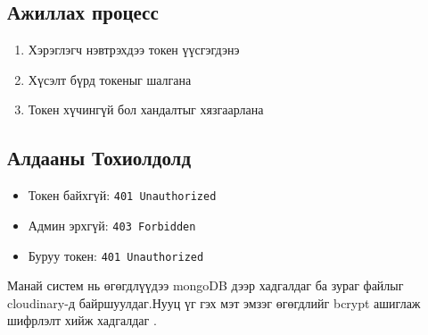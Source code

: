 \subsection{Ажиллах процесс}
\begin{enumerate}
\item Хэрэглэгч нэвтрэхдээ токен үүсгэгдэнэ
\item Хүсэлт бүрд токеныг шалгана
\item Токен хүчингүй бол хандалтыг хязгаарлана
\end{enumerate}

\subsection{Алдааны Тохиолдолд}

\begin{itemize}
\item Токен байхгүй: \texttt{401 Unauthorized}
\item Админ эрхгүй: \texttt{403 Forbidden}
\item Буруу токен: \texttt{401 Unauthorized}
\end{itemize}
Манай систем нь өгөгдлүүдээ mongoDB дээр хадгалдаг  ба зураг файлыг cloudinary-д байршуулдаг.Нууц үг гэх мэт эмзэг өгөгдлийг bcrypt ашиглаж шифрлэлт хийж хадгалдаг .
 


